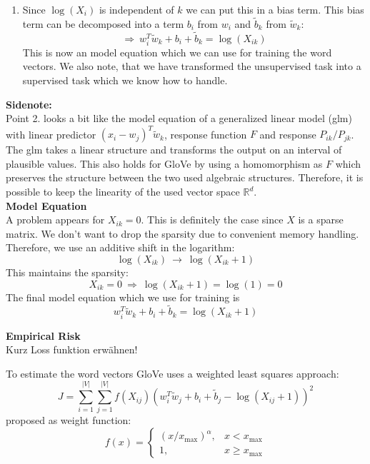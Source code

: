 \begin{enumerate}
\begin{enumerate}
        \item
          Since $\log(X_i)$ is independent of $k$ we can put this in a bias term. This
          bias term can be decomposed into a term $b_i$ from $w_i$ and 
          $\tilde{b}_k$ from $\tilde{w}_k$:
          \[
          \Rightarrow\ w_i^T\tilde{w}_k + b_i + \tilde{b}_k = \log(X_{ik})
          \]
          This is now an model equation which we can use for training the word vectors.
          We also note, that we have transformed the unsupervised task into a 
          supervised task which we know how to handle.
      \end{enumerate}
\end{enumerate}

\textbf{Sidenote:} \\

Point 2. looks a bit like the model equation of a generalized linear model (glm) 
with linear predictor $(x_i - w_j)^T\tilde{w}_k$, response function $F$ and response 
$P_{ik} / P_{jk}$. The glm takes a linear structure and transforms the output on an
interval of plausible values. This also holds for GloVe by using a homomorphism as $F$
which preserves the structure between the two used algebraic structures. Therefore, it 
is possible to keep the linearity of the used vector space $\mathbb{R}^d$. \\

\textbf{Model Equation} \\

A problem appears for $X_{ik} = 0$. This is definitely the case since $X$ is 
a sparse matrix. We don't want to drop the sparsity due to convenient
memory handling. Therefore, we use an additive shift in the logarithm:
\[
\log(X_{ik})\ \rightarrow\ \log(X_{ik} + 1)
\]
This maintains the sparsity: 
\[
X_{ik} = 0\ \Rightarrow\ \log(X_{ik} + 1) = \log(1) = 0
\]
The final model equation which we use for training is
\[
w_i^T\tilde{w}_k + b_i + \tilde{b}_k = \log(X_{ik} + 1)
\]

\textbf{Empirical Risk} \\

{\Huge Kurz Loss funktion erwähnen!}

To estimate the word vectors GloVe uses a weighted least squares approach:
\[
J = \sum\limits_{i=1}^{|V|}\sum\limits_{j=1}^{|V|}f(X_{ij})\left(w_i^T\tilde{w}_j + b_i + \tilde{b}_j - \log(X_{ij} + 1)\right)^2
\]
\cite{pennington2014glove} proposed as weight function:
\[
f(x) = \left\{
\begin{array}{ccc}
(x / x_\mathrm{max})^\alpha, & x < x_\mathrm{max} \\
1, & x \geq x_\mathrm{max}
\end{array}
\right.
\]

